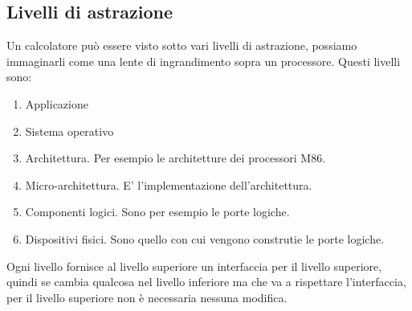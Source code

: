 \subsection{Livelli di astrazione}
Un calcolatore può essere visto sotto vari livelli di astrazione, possiamo immaginarli come una lente di ingrandimento sopra un processore. Questi livelli sono:
\begin{enumerate}
    \item Applicazione
    \item Sistema operativo
    \item Architettura. Per esempio le architetture dei processori M86.
    \item Micro-architettura. E' l'implementazione dell'architettura.
    \item Componenti logici. Sono per esempio le porte logiche.
    \item Dispositivi fisici. Sono quello con cui vengono construtie le porte logiche.
\end{enumerate}

\hspace{-15pt}Ogni livello fornisce al livello superiore un interfaccia per il livello superiore, quindi se cambia qualcosa nel livello inferiore ma che va a rispettare l'interfaccia, per il livello superiore non è necessaria nessuna modifica.